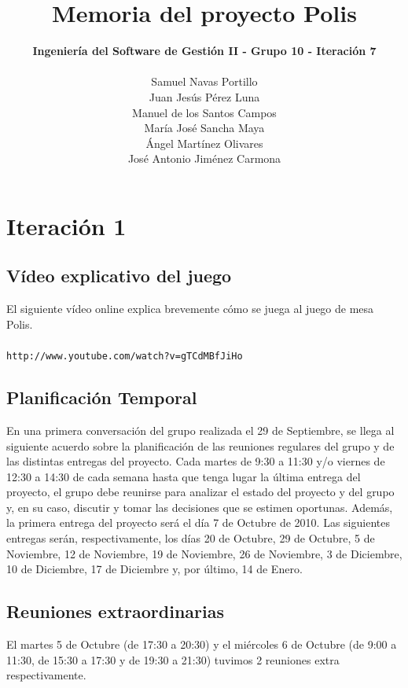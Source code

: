 \documentclass[11 pt]{book}
\begin{document}
\title{\textbf {\Huge Memoria del proyecto Polis}}
\author{
	\textbf {Ingeniería del Software de Gestión II - Grupo 10 - Iteración 7}\\\\
	Samuel Navas Portillo\\
	Juan Jesús Pérez Luna\\
	Manuel de los Santos Campos\\
	María José Sancha Maya\\
	Ángel Martínez Olivares\\
	José Antonio Jiménez Carmona}
\maketitle
\tableofcontents{}

\chapter{Iteración 1}
	\section{Vídeo explicativo del juego}
		El siguiente vídeo online explica brevemente cómo se juega al juego de mesa Polis.\\ \\
		\texttt{http://www.youtube.com/watch?v=gTCdMBfJiHo}
		
	\section{Planificación Temporal}
		En una primera conversación del grupo realizada el 29 de Septiembre, se llega al siguiente acuerdo sobre la planificación de las reuniones regulares del grupo y de las distintas entregas del proyecto. Cada martes de 9:30 a 11:30 y/o viernes de 12:30 a 14:30 de cada semana hasta que tenga lugar la última entrega del proyecto, el grupo debe reunirse para analizar el estado del proyecto y del grupo y, en su caso, discutir y tomar las decisiones que se estimen oportunas. Además, la primera entrega del proyecto será el día 7 de Octubre de 2010. Las siguientes entregas serán, respectivamente, los días 20 de Octubre, 29 de Octubre, 5 de Noviembre, 12 de Noviembre, 19 de Noviembre, 26 de Noviembre, 3 de Diciembre, 10 de Diciembre, 17 de Diciembre y, por último, 14 de Enero.
		
	\section{Reuniones extraordinarias}
		El martes 5 de Octubre (de 17:30 a 20:30) y el miércoles 6 de Octubre (de 9:00 a 11:30, de 15:30 a 17:30 y de 19:30 a 21:30) tuvimos 2 reuniones extra respectivamente.
		
\end{document}

